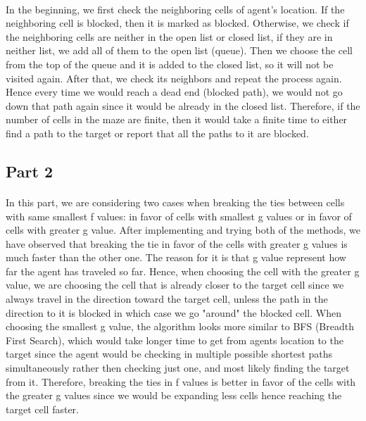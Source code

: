 \documentclass{article}
\begin{document}
\paragraph*{}
In the beginning, we first check the neighboring cells of agent's location. If the neighboring cell is blocked, then it is marked as blocked. Otherwise, we check if the neighboring cells are neither in the open list or closed list, if they are in neither list, we add all of them to the open list (queue). Then we choose the cell from the top of the queue and it is added to the closed list, so it will not be visited again. After that, we check its neighbors and repeat the process again. Hence every time we would reach a dead end (blocked path), we would not go down that path again since it would be already in the closed list. Therefore, if the number of cells in the maze are finite, then it would take a finite time to either find a path to the target or report that all the paths to it are blocked.\par

\subsection*{Part 2}
\paragraph*{}
In this part, we are considering two cases when breaking the ties between cells with same smallest f values: in favor of cells with smallest g values or in favor of cells with greater g value. After implementing and trying both of the methods, we have observed that breaking the tie in favor of the cells with greater g values is much faster than the other one. The reason for it is that g value represent how far the agent has traveled so far. Hence, when choosing the cell with the greater g value, we are choosing the cell that is already closer to the target cell since we always travel in the direction toward the target cell, unless the path in the direction to it is blocked in which case we go "around" the blocked cell. When choosing the smallest g value, the algorithm looks more similar to BFS (Breadth First Search), which would take longer time to get from agents location to the target since the agent would be checking in multiple possible shortest paths simultaneously rather then checking just one, and most likely finding the target from it. Therefore, breaking the ties in f values is better in favor of the cells with the greater g values since we would be expanding less cells hence reaching the target cell faster.\par
\end{document}
